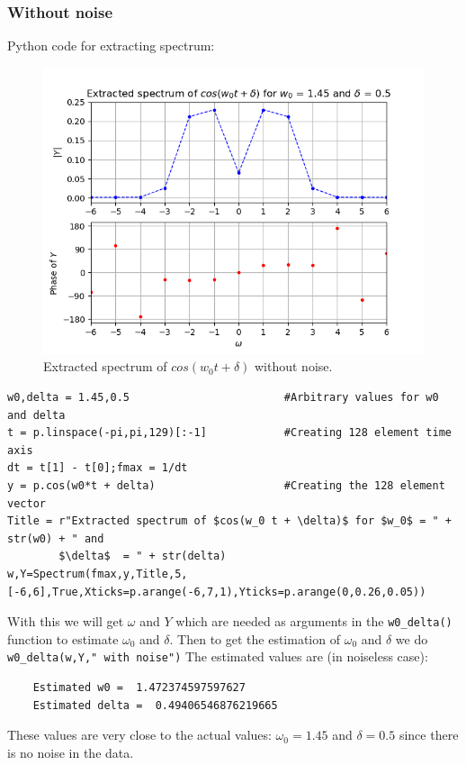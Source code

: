 \documentclass[11pt, a4paper]{article}
\begin{document}
        \subsubsection{Without noise}
        Python code for extracting spectrum:
            \begin{figure}[!h]
                \centering
                \includegraphics[scale = 0.65]{Figure 5.png}
                \caption{Extracted spectrum of $cos(w_0 t + \delta)$ without noise.}
                \label{fig:Figure 5}
            \end{figure}
            \begin{verbatim}
w0,delta = 1.45,0.5                        #Arbitrary values for w0 and delta
t = p.linspace(-pi,pi,129)[:-1]            #Creating 128 element time axis
dt = t[1] - t[0];fmax = 1/dt
y = p.cos(w0*t + delta)                    #Creating the 128 element vector
Title = r"Extracted spectrum of $cos(w_0 t + \delta)$ for $w_0$ = " + str(w0) + " and 
        $\delta$  = " + str(delta)
w,Y=Spectrum(fmax,y,Title,5,[-6,6],True,Xticks=p.arange(-6,7,1),Yticks=p.arange(0,0.26,0.05))
            \end{verbatim}
        With this we will get $\omega$ and $Y$ which are needed as arguments in the \texttt{w0\_delta()} function to estimate $\omega_0$ and $\delta$. Then to get the estimation of $\omega_0$ and $\delta$ we do \texttt{w0\_delta(w,Y," with noise")}
        The estimated values are (in noiseless case):
            \begin{verbatim}
    Estimated w0 =  1.472374597597627
    Estimated delta =  0.49406546876219665
            \end{verbatim}
        These values are very close to the actual values: $\omega_0 = 1.45$ and $\delta = 0.5$ since there is no noise in the data.
        
\end{document}
